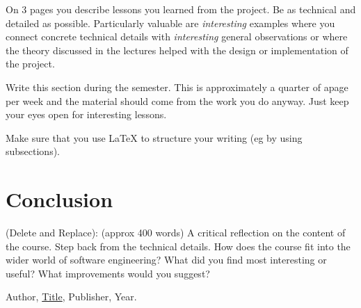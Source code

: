 \documentclass{article}
\theoremstyle{theorem}
\theoremstyle{definition}
\theoremstyle{remark}
\begin{document}
On 3 pages you describe lessons you learned from the project. Be as technical and detailed as possible. Particularly valuable are \emph{interesting} examples where you connect concrete technical details with \emph{interesting} general observations or where the theory discussed in the lectures helped with the design or implementation of the project.

Write this section during the semester. This is approximately a quarter of apage per week and the material should come from the work you do anyway. Just keep your eyes open for interesting lessons.

Make sure that you use \LaTeX{} to structure your writing (eg by using subsections).

\section{Conclusion}\label{conclusion}

(Delete and Replace): (approx 400 words) A critical reflection on the content of the course. Step back from the technical details. How does the course fit into the wider world of software engineering? What did you find most interesting or useful? What improvements would you suggest?

\begin{thebibliography}{99}
 Author, \href{https://en.wikipedia.org/wiki/LaTeX}{Title}, Publisher, Year.
\end{thebibliography}
\end{document}
